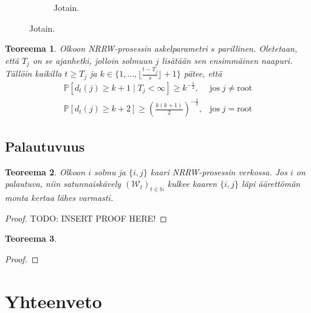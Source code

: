\documentclass[finnish, 12pt, a4paper, sci, utf8, pdfa]{aaltothesis}
\newcommand{\N}{\mathbb{N}}
\newcommand{\Wrandom}{\mathcal{W}}
\newcommand*{\prob}{\mathbb{P}}
\newtheorem{theorem}{Teoreema}
\begin{document}
\begin{figure}[htb]
\begin{subfigure}[b]{0.47\textwidth}
      \caption{Jotain. \label{figure:approx_cdf}}
   \end{subfigure}
\end{figure}

\begin{theorem}
   Olkoon NRRW-prosessin askelparametri $ s $ parillinen. Oletetaan, että $ T_{j} $ on se ajanhetki, jolloin solmuun $ j $ lisätään sen ensimmäinen naapuri. Tällöin kaikilla $ t \geq T_{j} $ ja $ k \in \{1,\ldots,\lfloor \frac{t-T_{j}}{s} \rfloor + 1\} $ pätee, että
   \[
      \renewcommand{\arraystretch}{2.0}
      \begin{array}{lr}
         \prob \left[ d_{t}(j) \geq k + 1 \mid T_{j} < \infty \right] \geq k^{-\frac{s}{2}},             & \text{jos} \; j \neq \text{root} \\
         \prob \left[ d_{t}(j) \geq k + 2 \right] \geq \left( \frac{k(k+1)}{2} \right)^{-\frac{s}{2}},   & \text{jos} \; j = \text{root}
      \end{array}
   \]
\end{theorem}

\subsection{Palautuvuus}

\begin{theorem}
Olkoon $ i $ solmu ja $ \{i, j\} $ kaari NRRW-prosessin verkossa. Jos $ i $ on palautuva, niin satunnaiskävely $ (\Wrandom_{t})_{t \in \N} $ kulkee kaaren $ \{i, j\} $ läpi äärettömän monta kertaa lähes varmasti.
\end{theorem}

\begin{proof}
TODO: INSERT PROOF HERE!
\end{proof}

\begin{theorem}

\end{theorem}

\begin{proof}

\end{proof}

\section{Yhteenveto}

\clearpage

\thesisbibliography
\end{document}
